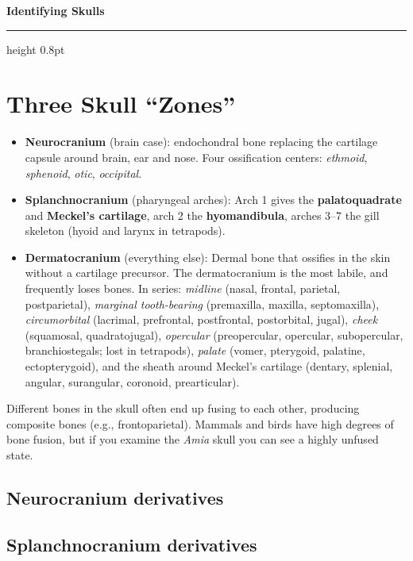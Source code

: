 \documentclass[11pt]{article}
\newcommand{\bone}[1]{\textbf{#1}}
\newcommand{\term}[1]{\textsl{#1}}
\begin{document}
\begin{center}
  {\LARGE\bfseries\color{headcol} Identifying Skulls}
\end{center}
\vspace{2pt}
\hrule height 0.8pt
\vspace{6pt}

\section{Three Skull ``Zones''}

\begin{itemize}
\item \bone{Neurocranium} (brain case): endochondral bone replacing the
  cartilage capsule around brain, ear and nose. Four ossification centers: \term{ethmoid}, \term{sphenoid}, \term{otic}, \term{occipital}.
\item \bone{Splanchnocranium} (pharyngeal arches): Arch 1 gives the
  \bone{palatoquadrate} and \bone{Meckel's cartilage}, arch 2 the
  \bone{hyomandibula}, arches 3--7 the gill skeleton (hyoid and
  larynx in tetrapods).
\item \bone{Dermatocranium} (everything else): Dermal bone that ossifies in the skin without a cartilage precursor. The dermatocranium is the most labile, and frequently loses bones. In series:
  \emph{midline} (nasal, frontal, parietal, postparietal), \emph{marginal
  tooth-bearing} (premaxilla, maxilla, septomaxilla), \emph{circumorbital}
  (lacrimal, prefrontal, postfrontal, postorbital, jugal), \emph{cheek}
  (squamosal, quadratojugal), \emph{opercular} (preopercular, opercular,
  subopercular, branchiostegals; lost in tetrapods), \emph{palate} (vomer,
  pterygoid, palatine, ectopterygoid), and the sheath around Meckel's cartilage
  (dentary, splenial, angular, surangular, coronoid, prearticular).
\end{itemize}

Different bones in the skull often end up fusing to each other, producing composite bones (e.g., frontoparietal). Mammals and birds have high degrees of bone fusion, but if you examine the \textit{Amia} skull you can see a highly unfused state.

\subsection*{Neurocranium derivatives}
\figNeurocranium

\subsection*{Splanchnocranium derivatives}
\figArches
\end{document}
